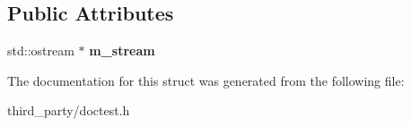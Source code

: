 \subsection*{Public Attributes}
\begin{DoxyCompactItemize}
\item 
\mbox{\label{structdoctest_1_1detail_1_1_message_builder_a5319d522ba62c91e59ffa7f6982756e5}} 
std\+::ostream $\ast$ {\bfseries m\+\_\+stream}
\end{DoxyCompactItemize}


The documentation for this struct was generated from the following file\+:\begin{DoxyCompactItemize}
\item 
third\+\_\+party/doctest.\+h\end{DoxyCompactItemize}
